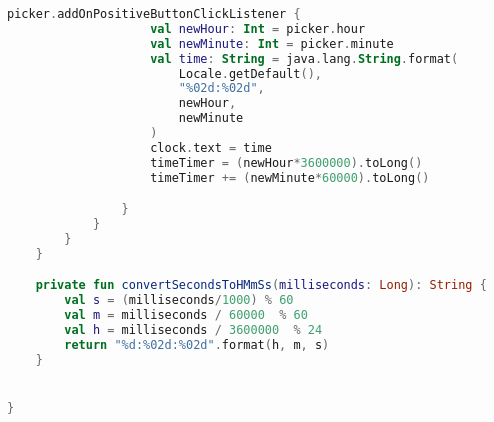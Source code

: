 \begin{lstlisting}[language=Kotlin, caption=\leftline{TimerFragment}, label=lst:TimerFragment]
                picker.addOnPositiveButtonClickListener {
                    val newHour: Int = picker.hour
                    val newMinute: Int = picker.minute
                    val time: String = java.lang.String.format(
                        Locale.getDefault(),
                        "%02d:%02d",
                        newHour,
                        newMinute
                    )
                    clock.text = time
                    timeTimer = (newHour*3600000).toLong()
                    timeTimer += (newMinute*60000).toLong()

                }
            }
        }
    }

    private fun convertSecondsToHMmSs(milliseconds: Long): String {
        val s = (milliseconds/1000) % 60
        val m = milliseconds / 60000  % 60
        val h = milliseconds / 3600000  % 24
        return "%d:%02d:%02d".format(h, m, s)
    }


}
\end{lstlisting}

